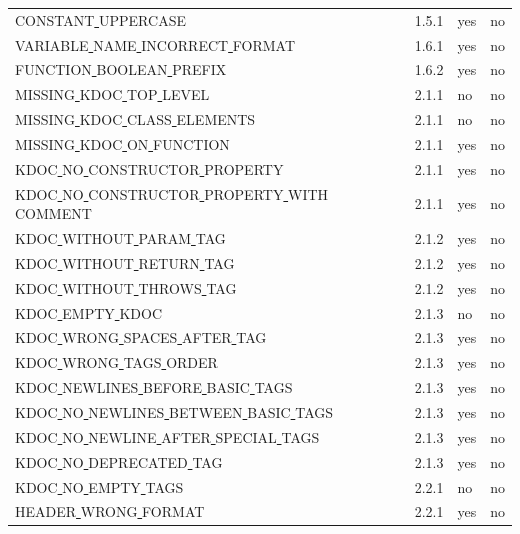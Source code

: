 \begin{center}
\begin{longtable}{ |l|p{0.8cm}|p{0.8cm}| p{3cm} | }
CONSTANT\underline{ }UPPERCASE & 1.5.1 &  yes  &   no  \\
VARIABLE\underline{ }NAME\underline{ }INCORRECT\underline{ }FORMAT & 1.6.1 &  yes  &   no  \\
FUNCTION\underline{ }BOOLEAN\underline{ }PREFIX & 1.6.2 &  yes  &   no  \\
MISSING\underline{ }KDOC\underline{ }TOP\underline{ }LEVEL & 2.1.1 &  no  &   no  \\
MISSING\underline{ }KDOC\underline{ }CLASS\underline{ }ELEMENTS & 2.1.1 &  no  &   no  \\
MISSING\underline{ }KDOC\underline{ }ON\underline{ }FUNCTION & 2.1.1 &  yes  &   no  \\
KDOC\underline{ }NO\underline{ }CONSTRUCTOR\underline{ }PROPERTY & 2.1.1 &  yes  &   no \\
KDOC\underline{ }NO\underline{ }CONSTRUCTOR\underline{ }PROPERTY\underline{ }WITH\underline{ }COMMENT & 2.1.1 &  yes  &   no \\
KDOC\underline{ }WITHOUT\underline{ }PARAM\underline{ }TAG & 2.1.2 &  yes  &   no  \\
KDOC\underline{ }WITHOUT\underline{ }RETURN\underline{ }TAG & 2.1.2 &  yes  &   no  \\
KDOC\underline{ }WITHOUT\underline{ }THROWS\underline{ }TAG & 2.1.2 &  yes  &   no  \\
KDOC\underline{ }EMPTY\underline{ }KDOC & 2.1.3 &  no  &   no  \\
KDOC\underline{ }WRONG\underline{ }SPACES\underline{ }AFTER\underline{ }TAG & 2.1.3 &  yes  &   no  \\
KDOC\underline{ }WRONG\underline{ }TAGS\underline{ }ORDER & 2.1.3 &  yes  &   no  \\
KDOC\underline{ }NEWLINES\underline{ }BEFORE\underline{ }BASIC\underline{ }TAGS & 2.1.3 &  yes  &   no  \\
KDOC\underline{ }NO\underline{ }NEWLINES\underline{ }BETWEEN\underline{ }BASIC\underline{ }TAGS & 2.1.3 &  yes  &   no  \\
KDOC\underline{ }NO\underline{ }NEWLINE\underline{ }AFTER\underline{ }SPECIAL\underline{ }TAGS & 2.1.3 &  yes  &   no  \\
KDOC\underline{ }NO\underline{ }DEPRECATED\underline{ }TAG & 2.1.3 &  yes  &   no  \\
KDOC\underline{ }NO\underline{ }EMPTY\underline{ }TAGS & 2.2.1 &  no  &   no  \\
HEADER\underline{ }WRONG\underline{ }FORMAT & 2.2.1 &  yes  &   no  \\

\end{longtable}
\end{center}
